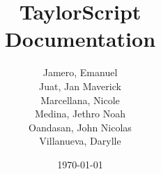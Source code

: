 

\title{
  \Huge{\textbf{TaylorScript}}\\
  \Large{Documentation}
  \vspace{10pt}
}
\author{
Jamero, Emanuel\\
Juat, Jan Maverick\\
Marcellana, Nicole\\
Medina, Jethro Noah\\
Oandasan, John Nicolas\\
Villanueva, Darylle\\
}
\date{\today}


\gappto{\UrlBreaks}{\UrlOrds}

\hypersetup {
  colorlinks,
  citecolor=red,
  filecolor=black,
  linkcolor=black,
  urlcolor=blue
}

\newcommand{\incfig}[2][1]{%
    \def\svgwidth{#1\columnwidth}
    {#2.pdf_tex}
}



\newtheorem{theorem}{Theorem}[section]
\newtheorem{corollary}{Corollary}[theorem]
\newtheorem{lemma}[theorem]{Lemma}
